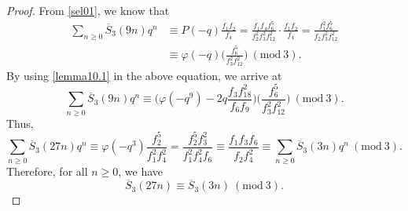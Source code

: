 \documentclass[10pt,a4paper]{amsart}
\begin{document}
\begin{proof}
From \eqref{sel01}, we know that
\begin{align*}
\sum_{n \geq 0} \overline{S}_{3}(9n) q^{n} &\equiv P(-q) \frac{f_1 f_2}{f_{4}} = \frac{f_1 f_4 f_6^5}{f_2^2 f_3^2 f_{12}^2}  \cdot \frac{f_1 f_2}{f_{4}} = \frac{f_1^2 f_6^5}{f_2 f_3^2 f_{12}^2} \\
&\equiv  \varphi(-q) \bigg( \frac{ f_6^5}{ f_3^2 f_{12}^2} \bigg)
\ (\mathrm{mod} \ 3).
\end{align*}
By using \eqref{lemma10.1} in the above equation, we arrive at
\[
\sum_{n \geq 0} \overline{S}_{3}(9n) q^{n} \equiv \bigg(  \varphi(-q^9) -2q\dfrac{f_{3}f_{18}^{2}}{f_{6}f_{9}} \bigg) \bigg( \frac{ f_6^5}{ f_3^2 f_{12}^2} \bigg) \ (\mathrm{mod} \ 3).
\]
Thus, 
\[
\sum_{n \geq 0} \overline{S}_{3}(27n) q^{n} \equiv  \varphi(-q^3) \frac{ f_2^5}{ f_1^2 f_{4}^2} =  \frac{ f_2^5 f_3^2}{ f_1^2 f_{4}^2 f_6} \equiv \frac{f_1 f_3 f_6}{f_2 f_4^2} \equiv \sum_{n \geq 0} \overline{S}_{3}(3n) q^{n}  \ (\mathrm{mod} \ 3).
\]
Therefore, for all $n\geq 0$, we have
\[
\overline{S}_{3}(27n) \equiv  \overline{S}_{3}(3n) \ (\mathrm{mod} \ 3).
\]
\end{proof}
\end{document}
